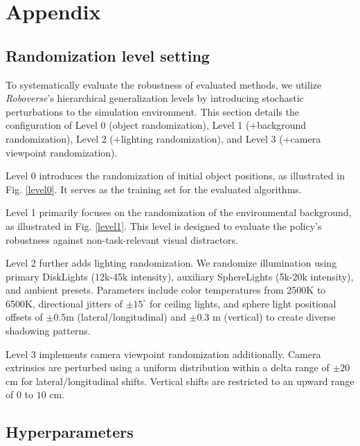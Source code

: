 \documentclass[onecolumn]{fairmeta}
\begin{document}
	
	
	\clearpage
	\newpage
	
	
	
	\clearpage
	\newpage
	
	\appendix
	
	\section{Appendix}
	
	\subsection{Randomization level setting} \label{appen_dr}
	
	To systematically evaluate the robustness of evaluated methods, we utilize \textit{Roboverse}'s hierarchical generalization levels by introducing stochastic perturbations to the simulation environment. This section details the configuration of Level 0 (object randomization), Level 1 (+background randomization), Level 2 (+lighting randomization), and Level 3 (+camera viewpoint randomization).
	
	Level 0 introduces the randomization of initial object positions, as illustrated in Fig. \ref{level0}. It serves as the training set for the evaluated algorithms.
	
	Level 1 primarily focuses on the randomization of the environmental background, as illustrated in Fig. \ref{level1}. This level is designed to evaluate the policy's robustness against non-task-relevant visual distractors.
	
	Level 2 further adds lighting randomization. We randomize illumination using primary DiskLights (12k-45k intensity), auxiliary SphereLights (5k-20k intensity), and ambient presets. Parameters include color temperatures from 2500K to 6500K, directional jitters of $\pm 15^\circ$ for ceiling lights, and sphere light positional offsets of $\pm 0.5$m (lateral/longitudinal) and $\pm 0.3$ m (vertical) to create diverse shadowing patterns.
	
	Level 3 implements camera viewpoint randomization additionally. Camera extrinsics are perturbed using a uniform distribution within a delta range of $\pm 20$cm for lateral/longitudinal shifts. Vertical shifts are restricted to an upward range of $0$ to $10$ cm.
	
	
	\subsection{Hyperparameters} \label{appen_param}
	
\end{document}
